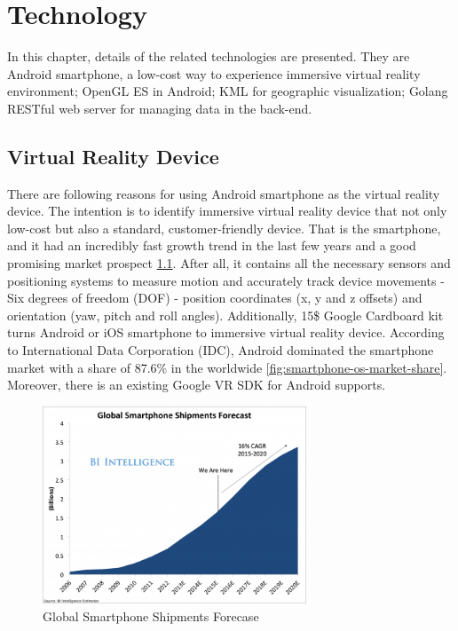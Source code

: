 \chapter{Technology}
\label{chapter-technology}

In this chapter, details of the related technologies are presented. They are Android smartphone, a low-cost way to experience immersive virtual reality environment; OpenGL ES in Android; KML for geographic visualization; Golang RESTful web server for managing data in the back-end.

\section{Virtual Reality Device}

There are following reasons for using Android smartphone as the virtual reality device. The intention is to identify immersive virtual reality device that not only low-cost but also a standard, customer-friendly device. That is the smartphone, and it had an incredibly fast growth trend in the last few years and a good promising market prospect \ref{fig:smartphone-shipments-forecast}. After all, it contains all the necessary sensors and positioning systems to measure motion and accurately track device movements - Six degrees of freedom (DOF) - position coordinates (x, y and z offsets) and orientation (yaw, pitch and roll angles). Additionally, 15\$ Google Cardboard kit turns Android or iOS smartphone to immersive virtual reality device. According to International Data Corporation (IDC), Android dominated the smartphone market with a share of 87.6\% in the worldwide \ref{fig:smartphone-os-market-share}. Moreover, there is an existing Google VR SDK \cite{google.vr-sdk.2016} for Android supports.

\begin{figure}[H]
\caption[Global Smartphone Shipments Forecase]{Global Smartphone Shipments Forecase \cite{tony.global-smartphone-market.2015}}
\label{fig:smartphone-shipments-forecast}
\centering
\includegraphics[width=0.7\textwidth, keepaspectratio]{Figures/smartphone-shipments-forecast.png}
\decoRule
\end{figure}

